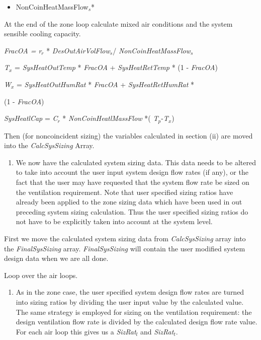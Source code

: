 \begin{itemize}
\tightlist
\item
  NonCoinHeatMassFlow\(_{s}\)*
\end{itemize}

At the end of the zone loop calculate mixed air conditions and the system sensible cooling capacity.

\emph{FracOA = r\(_{r}\)} * \emph{DesOutAirVolFlow\(_{s}\)}/ \emph{NonCoinHeatMassFlow\(_{s}\)}

\emph{T\(_{x}\)} = \emph{SysHeatOutTemp} * \emph{FracOA} + \emph{SysHeatRetTemp} * (1 - \emph{FracOA})

\emph{W\(_{x}\)} = \emph{SysHeatOutHumRat} * \emph{FracOA} + \emph{SysHeatRetHumRat} *

(1 - \emph{FracOA})

\emph{SysHeatlCap} = \emph{C\(_{r}\)} * \emph{NonCoinHeatlMassFlow} *( \emph{T\(_{p}\)}-\emph{T\(_{x}\)})

Then (for noncoincident sizing) the variables calculated in section (ii) are moved into the \emph{CalcSysSizing} Array.

\begin{enumerate}
\def\labelenumi{(\arabic{enumi})}
\setcounter{enumi}{1}
\tightlist
\item
  We now have the calculated system sizing data. This data needs to be altered to take into account the user input system design flow rates (if any), or the fact that the user may have requested that the system flow rate be sized on the ventilation requirement. Note that user specified sizing ratios have already been applied to the zone sizing data which have been used in out preceding system sizing calculation. Thus the user specified sizing ratios do not have to be explicitly taken into account at the system level.
\end{enumerate}

First we move the calculated system sizing data from \emph{CalcSysSizing} array into the \emph{FinalSysSizing} array. \emph{FinalSysSizing} will contain the user modified system design data when we are all done.

Loop over the air loops.

\begin{enumerate}
\def\labelenumi{(\roman{enumi})}
\tightlist
\item
  As in the zone case, the user specified system design flow rates are turned into sizing ratios by dividing the user input value by the calculated value. The same strategy is employed for sizing on the ventilation requirement: the design ventilation flow rate is divided by the calculated design flow rate value. For each air loop this gives us a \emph{SizRat\(_{l}\)} and \emph{SizRat\(_{t}\)}.
\end{enumerate}

